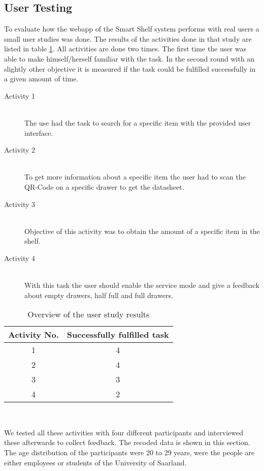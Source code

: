 \subsection{User Testing} 
To evaluate how the webapp of the Smart Shelf system performs with real users a small user studies was done. 
The results of the activities done in that study are listed in table \ref{tab:user-study-results}. 
All activities are done two times. 
The first time the user was able to make himself/herself familiar with the task. 
In the second round with an slightly other objective it is measured if the task could be fulfilled successfully in a given amount of time. 
\begin{description}
	\item[Activity 1] \hfill \\ 
	The use had the task to search for a specific item with the provided user interface. 
	\item [Activity 2] \hfill \\
	To get more information about a specific item the user had to scan the QR-Code on a specific drawer to get the datasheet. 
	\item [Activity 3] \hfill \\
	Objective of this activity was to obtain the amount of a specific item in the shelf. 
	\item [Activity 4] \hfill \\
	With this task the user should enable the service mode and give a feedback about empty drawers, half full and full drawers. 
\end{description}
%
\begin{table}
	\begin{tabular}{|c|c|}
		\hline 
		Activity No. & Successfully fulfilled task \\
		\hline 
		1 & 4  \\ 
		\hline 
		2 & 4  \\ 
		\hline 
		3 & 3  \\ 
		\hline 
		4 & 2  \\ 
		\hline 
	\end{tabular} 
	\caption{Overview of the user study results}~\label{tab:user-study-results}
\end{table}
%
We tested all these activities with four different participants and interviewed these afterwards to collect feedback. 
The recoded data is shown in this section. 
The age distribution of the participants were 20 to 29 years, were the people are either employees or students of the University of Saarland. 
